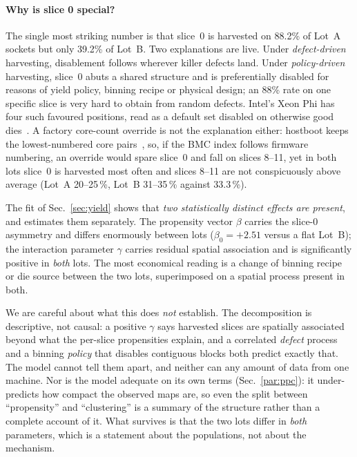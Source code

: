 \documentclass[10pt,conference]{IEEEtran}
\begin{document}
\paragraph*{Why is slice 0 special?} The single most striking number is that slice~0 is harvested on
88.2\% of Lot~A sockets but only 39.2\% of Lot~B. Two explanations are live. Under
\emph{defect-driven} harvesting, disablement follows wherever killer defects land. Under
\emph{policy-driven} harvesting, slice~0 abuts a shared structure and is preferentially disabled for
reasons of yield policy, binning recipe or physical design; an 88\% rate on one specific slice is
very hard to obtain from random defects. Intel's Xeon Phi has four such favoured positions, read
as a default set disabled on otherwise good dies~\cite{mccalpin2021knl}. A factory core-count
override is not the explanation either: hostboot keeps the lowest-numbered core
pairs~\cite{hostboot_p9}, so, if the BMC index follows firmware numbering, an override would spare
slice~0 and fall on slices 8--11, yet in both lots slice~0 is harvested most often and slices
8--11 are not conspicuously above average (Lot~A 20--25\,\%, Lot~B 31--35\,\% against 33.3\,\%).

The fit of Sec.~\ref{sec:yield} shows that \emph{two statistically distinct effects are present},
and estimates them separately. The propensity vector $\beta$ carries the slice-0 asymmetry and
differs enormously between lots ($\beta_0=+2.51$ versus a flat Lot~B); the interaction parameter
$\gamma$ carries residual spatial association and is significantly positive in \emph{both} lots.
The most economical reading is a change of binning recipe or die source between the two
lots, superimposed on a spatial process present in both.

We are careful about what this does \emph{not} establish. The decomposition is descriptive, not
causal: a positive $\gamma$ says harvested slices are spatially associated beyond what the
per-slice propensities explain, and a correlated \emph{defect} process and a binning \emph{policy}
that disables contiguous blocks both predict exactly that. The model cannot tell them apart, and
neither can any amount of data from one machine. Nor is the model adequate on its own terms
(Sec.~\ref{par:ppc}): it under-predicts how compact the observed maps are, so even the split
between ``propensity'' and ``clustering'' is a summary of the structure rather than a complete
account of it. What survives is that the two lots
differ in \emph{both} parameters, which is a statement about the populations, not about the
mechanism.
\end{document}
